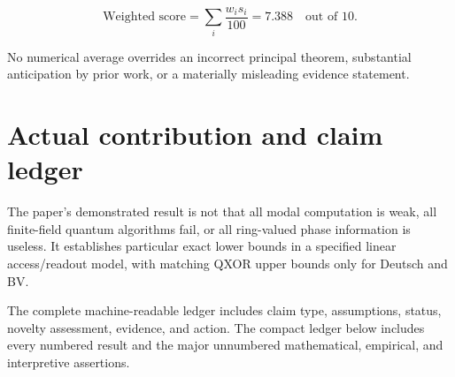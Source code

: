 \documentclass[
  11pt,
]{article}
\begin{document}
\[
\text{Weighted score}=\sum_i\frac{w_i s_i}{100}=7.388\quad\text{out of }10.
\]

No numerical average overrides an incorrect principal theorem,
substantial anticipation by prior work, or a materially misleading
evidence statement.

\section{Actual contribution and claim
ledger}\label{actual-contribution-and-claim-ledger}

The paper's demonstrated result is not that all modal computation is
weak, all finite-field quantum algorithms fail, or all ring-valued phase
information is useless. It establishes particular exact lower bounds in
a specified linear access/readout model, with matching QXOR upper bounds
only for Deutsch and BV.

The complete machine-readable ledger includes claim type, assumptions,
status, novelty assessment, evidence, and action. The compact ledger
below includes every numbered result and the major unnumbered
mathematical, empirical, and interpretive assertions.
\end{document}
